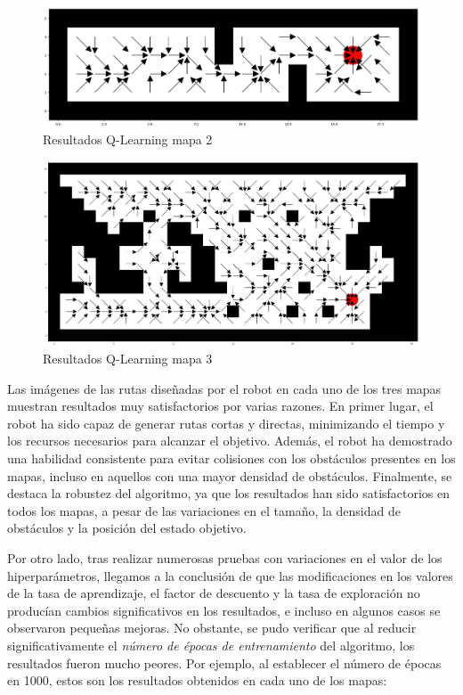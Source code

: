 \documentclass[conference,a4paper]{IEEEtran}
\begin{document}
\begin{figure}[h]
  \centering
  \includegraphics[scale=0.33]{resultado_qlearning_mapa_2}
  \caption{Resultados Q-Learning mapa 2}
  \label{fig:resultado_qlearning_mapa_2}
\end{figure}

\begin{figure}[h]
  \centering
  \includegraphics[scale=0.33]{resultado_qlearning_mapa_3}
  \caption{Resultados Q-Learning mapa 3}
  \label{fig:resultado_qlearning_mapa_3}
\end{figure}

Las imágenes de las rutas diseñadas por el robot en cada uno de los tres mapas muestran resultados muy satisfactorios por varias razones.
En primer lugar, el robot ha sido capaz de generar rutas cortas y directas, minimizando el tiempo y los recursos necesarios para alcanzar el objetivo.
Además, el robot ha demostrado una habilidad consistente para evitar colisiones con los obstáculos presentes en los mapas, incluso en aquellos con una mayor densidad de obstáculos. Finalmente, se destaca la robustez del algoritmo, 
ya que los resultados han sido satisfactorios en todos los mapas, a pesar de las variaciones en el tamaño, la densidad de obstáculos y la posición del estado objetivo.\newline

Por otro lado, tras realizar numerosas pruebas con variaciones en el valor de los hiperparámetros, llegamos a la conclusión de que las modificaciones en los valores de la tasa de aprendizaje, el factor de descuento y la tasa de exploración no producían cambios significativos en los resultados,
e incluso en algunos casos se observaron pequeñas mejoras. No obstante, se pudo verificar que al reducir significativamente el \textit{número de épocas de entrenamiento} 
del algoritmo, los resultados fueron mucho peores. Por ejemplo, al establecer el número de épocas en 1000,
estos son los resultados obtenidos en cada uno de los mapas:
\end{document}
